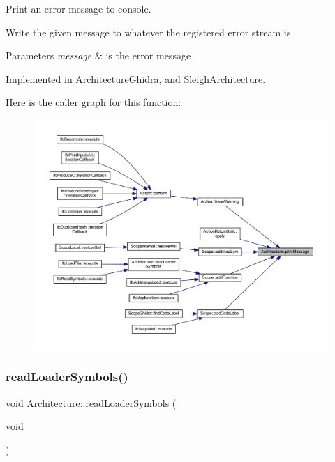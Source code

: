 Print an error message to console. 

Write the given message to whatever the registered error stream is 
\begin{DoxyParams}{Parameters}
{\em message} & is the error message \\
\hline
\end{DoxyParams}


Implemented in \mbox{\hyperlink{class_architecture_ghidra_ae7cdac6309428d288bc2317f9997aa4e}{Architecture\+Ghidra}}, and \mbox{\hyperlink{class_sleigh_architecture_a70cc8c22ebab95cf41ab21b7d886c08f}{Sleigh\+Architecture}}.

Here is the caller graph for this function\+:
\nopagebreak
\begin{figure}[H]
\begin{center}
\leavevmode
\includegraphics[width=350pt]{class_architecture_a69348906c7601efa002f1f1365decda9_icgraph}
\end{center}
\end{figure}
\mbox{\label{class_architecture_ac6c95a933f8a42d6d1d46d8663a793a2}} 
\subsubsection{\texorpdfstring{readLoaderSymbols()}{readLoaderSymbols()}}
{\footnotesize\ttfamily void Architecture\+::read\+Loader\+Symbols (\begin{DoxyParamCaption}\item[{void}]{ }\end{DoxyParamCaption})}



